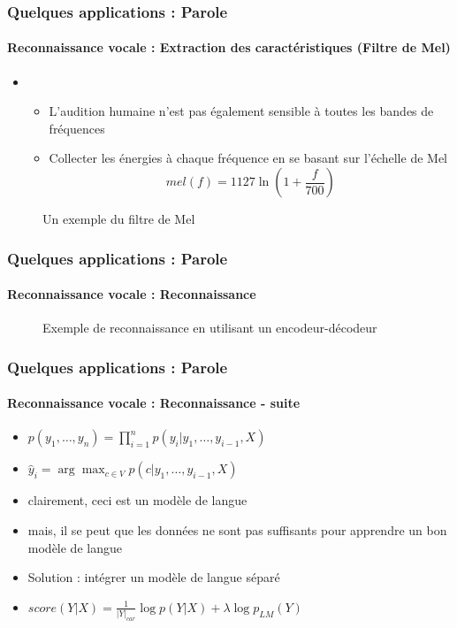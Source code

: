\documentclass[xcolor=table]{beamer}
\begin{document}
\begin{frame}
	\frametitle{Quelques applications : Parole}
	\framesubtitle{Reconnaissance vocale : Extraction des caractéristiques (Filtre de Mel)}
	\begin{itemize}
		\item {}
		\begin{itemize}
			\item L'audition humaine n'est pas également sensible à toutes les bandes de fréquences
			\item Collecter les énergies à chaque fréquence en se basant sur l'échelle de Mel
			\[mel(f) = 1127 \ln (1 + \frac{f}{700})\]
		\end{itemize}
	\end{itemize}
	\begin{figure}
		\centering
		\caption{Un exemple du filtre de Mel \cite{2020-jurafsky-martin}}
	\end{figure}
\end{frame}

\begin{frame}
	\frametitle{Quelques applications : Parole}
	\framesubtitle{Reconnaissance vocale : Reconnaissance}
	\begin{figure}
		\centering
		\caption{Exemple de reconnaissance en utilisant un encodeur-décodeur \cite{2020-jurafsky-martin}}
	\end{figure}
\end{frame}

\begin{frame}
	\frametitle{Quelques applications : Parole}
	\framesubtitle{Reconnaissance vocale : Reconnaissance - suite}
	\begin{itemize}
		\item $p(y_1, \ldots, y_n) = \prod\limits_{i=1}^n p(y_i| y_1, \ldots, y_{i-1}, X)$
		
		\item $\hat{y}_i = \arg\max_{c \in V} p(c| y_1, \ldots, y_{i-1}, X)$
		
		\item clairement, ceci est un modèle de langue
		\item mais, il se peut que les données ne sont pas suffisants pour apprendre un bon modèle de langue
		\item Solution : intégrer un modèle de langue séparé
		
		\item $score(Y|X) = \frac{1}{|Y|_{car}} \log p(Y|X) + \lambda \log p_{LM}(Y)$
	\end{itemize}
\end{frame}
\end{document}
